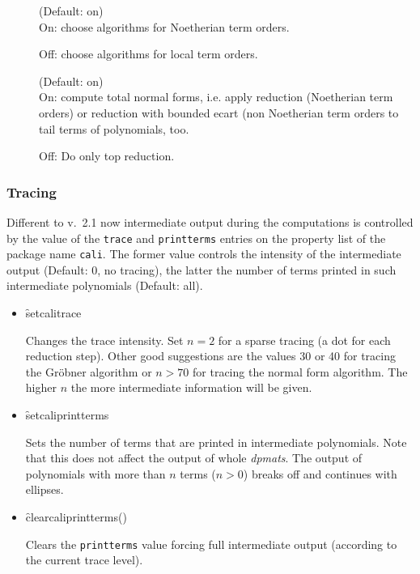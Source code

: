 \begin{description}
\item[]
  \hypertarget{switch:NOETHERIAN}{}
  (Default: on)\\
On: choose algorithms for Noetherian term orders.

Off: choose algorithms for local term orders.

\item[]
  \hypertarget{switch:RED_TOTAL}{}
  (Default: on)\\
On: compute total normal forms, i.e. apply reduction (Noetherian
term orders) or reduction with bounded ecart (non Noetherian term
orders to tail terms of polynomials, too.

Off: Do only top reduction.

\end{description}

\subsubsection*{Tracing}

Different to v.~2.1 now intermediate output during the computations
is controlled by the value of the \texttt{trace} and \texttt{printterms}
entries on the property list of the package name \texttt{cali}. The
former value controls the intensity of the intermediate output
(Default: 0, no tracing), the latter the number of terms printed in
such intermediate polynomials (Default: all).
\begin{itemize}
\item[]
  \hypertarget{operator:SETCALITRACE}{}
  \begin{syntax}
    \f{setcalitrace} 
  \end{syntax}
Changes the trace intensity. Set $n=2$ for a sparse tracing (a
dot for each reduction step).
Other good suggestions are the values 30 or 40 for tracing the Gr\"obner
algorithm or $n>70$ for tracing the normal form algorithm. The higher
$n$ the more intermediate information will be given.

\item[]
  \hypertarget{operator:SETCALIPRINTTERMS}{}
  \begin{syntax}
    \f{setcaliprintterms} 
  \end{syntax}
Sets the number of terms that are printed in intermediate
polynomials. Note that this does not affect the output of whole
\emph{dpmats}. The output of polynomials with more than $n$ terms ($n>0$)
breaks off and continues with ellipses.

\item[]
  \hypertarget{operator:CLEARCALIPRINTTERMS}{}
  \begin{syntax}
    \f{clearcaliprintterms}()
  \end{syntax}
Clears the \texttt{printterms} value forcing full intermediate
output (according to the current trace level).
\end{itemize}


